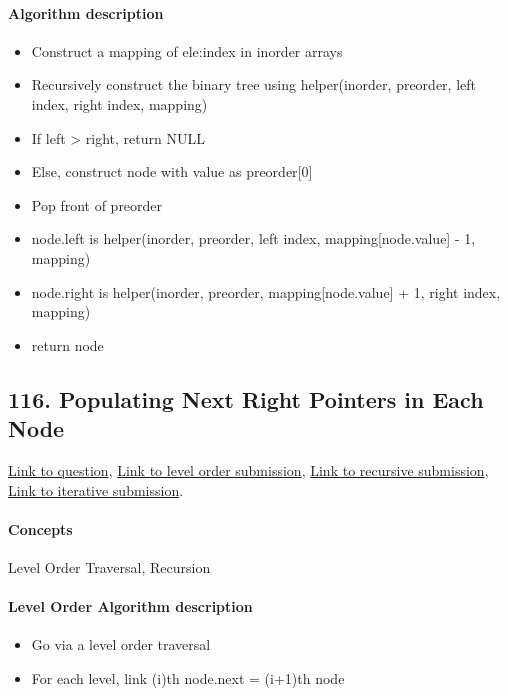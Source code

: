 \documentclass[11pt]{book}
\begin{document}
\paragraph{Algorithm description}
\begin{itemize}
    \item Construct a mapping of ele:index in inorder arrays
    \item Recursively construct the binary tree using helper(inorder, preorder, left index, right index, mapping)
    \item If left > right, return NULL
    \item Else, construct node with value as preorder[0]
    \item Pop front of preorder
    \item node.left is helper(inorder, preorder, left index, mapping[node.value] - 1, mapping)
    \item node.right is helper(inorder, preorder, mapping[node.value] + 1, right index, mapping)
    \item return node
\end{itemize}

\subsection{116. Populating Next Right Pointers in Each Node}
\href{https://leetcode.com/problems/populating-next-right-pointers-in-each-node/}{Link to question},
\href{https://leetcode.com/submissions/detail/338234563/}{Link to level order submission},
\href{https://leetcode.com/submissions/detail/338238274/}{Link to recursive submission},
\href{https://leetcode.com/submissions/detail/338241582/}{Link to iterative submission}.
\paragraph{Concepts}
Level Order Traversal, Recursion
\paragraph{Level Order Algorithm description}
\begin{itemize}
    \item Go via a level order traversal
    \item For each level, link (i)th node.next = (i+1)th node
\end{itemize}
\end{document}
